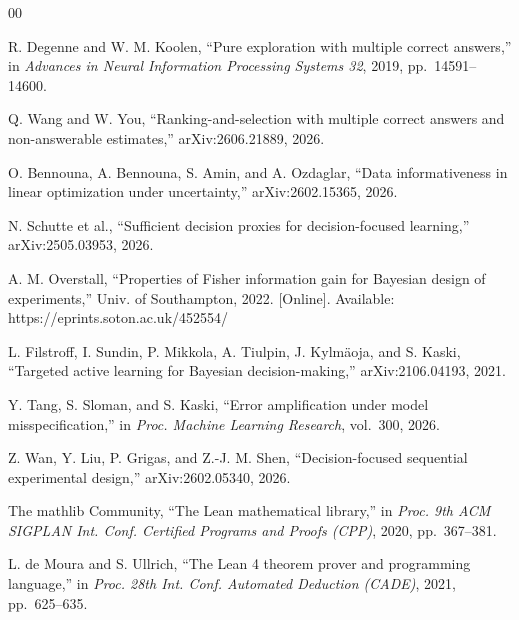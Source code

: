 \begin{thebibliography}{00}

 R. Degenne and W. M. Koolen, ``Pure exploration with multiple correct
answers,'' in \emph{Advances in Neural Information Processing Systems 32}, 2019,
pp.~14591--14600.

 Q. Wang and W. You, ``Ranking-and-selection with multiple correct
answers and non-answerable estimates,'' arXiv:2606.21889, 2026.

 O. Bennouna, A. Bennouna, S. Amin, and A. Ozdaglar, ``Data
informativeness in linear optimization under uncertainty,'' arXiv:2602.15365, 2026.

 N. Schutte et al., ``Sufficient decision proxies for
decision-focused learning,'' arXiv:2505.03953, 2026.

 A. M. Overstall, ``Properties of Fisher information gain for
Bayesian design of experiments,'' Univ. of Southampton, 2022. [Online]. Available:
https://eprints.soton.ac.uk/452554/

 L. Filstroff, I. Sundin, P. Mikkola, A. Tiulpin, J. Kylm\"{a}oja,
and S. Kaski, ``Targeted active learning for Bayesian decision-making,'' arXiv:2106.04193,
2021.

 Y. Tang, S. Sloman, and S. Kaski, ``Error amplification under model
misspecification,'' in \emph{Proc. Machine Learning Research}, vol.~300, 2026.

 Z. Wan, Y. Liu, P. Grigas, and Z.-J. M. Shen, ``Decision-focused
sequential experimental design,'' arXiv:2602.05340, 2026.

 The mathlib Community, ``The Lean mathematical library,'' in
\emph{Proc. 9th ACM SIGPLAN Int. Conf. Certified Programs and Proofs (CPP)}, 2020,
pp.~367--381.

 L. de Moura and S. Ullrich, ``The Lean 4 theorem prover and
programming language,'' in \emph{Proc. 28th Int. Conf. Automated Deduction (CADE)}, 2021,
pp.~625--635.

\end{thebibliography}


